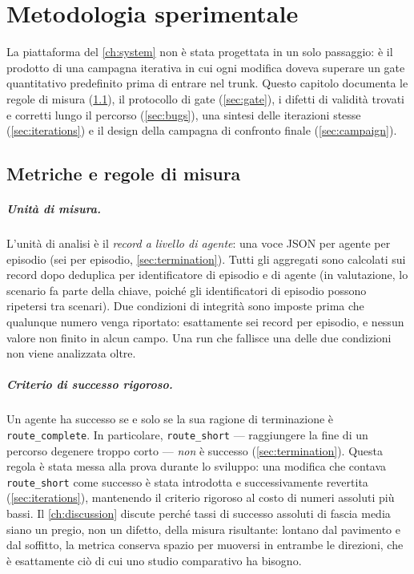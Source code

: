 \chapter{Metodologia sperimentale}
\label{ch:methodology}

La piattaforma del \cref{ch:system} non è stata progettata in un solo
passaggio: è il prodotto di una campagna iterativa in cui ogni modifica
doveva superare un gate quantitativo predefinito prima di entrare nel
trunk. Questo capitolo documenta le regole di misura
(\cref{sec:metrics}), il protocollo di gate (\cref{sec:gate}), i difetti
di validità trovati e corretti lungo il percorso (\cref{sec:bugs}), una
sintesi delle iterazioni stesse (\cref{sec:iterations}) e il design
della campagna di confronto finale (\cref{sec:campaign}).

\section{Metriche e regole di misura}
\label{sec:metrics}

\paragraph{Unità di misura.}
L'unità di analisi è il \emph{record a livello di agente}: una voce JSON
per agente per episodio (sei per episodio, \cref{sec:termination}).
Tutti gli aggregati sono calcolati sui record dopo deduplica per
identificatore di episodio e di agente (in valutazione, lo scenario fa
parte della chiave, poiché gli identificatori di episodio possono
ripetersi tra scenari). Due condizioni di integrità sono imposte prima
che qualunque numero venga riportato: esattamente sei record per
episodio, e nessun valore non finito in alcun campo. Una run che fallisce
una delle due condizioni non viene analizzata oltre.

\paragraph{Criterio di successo rigoroso.}
Un agente ha successo se e solo se la sua ragione di terminazione è
\texttt{route\_complete}. In particolare, \texttt{route\_short} ---
raggiungere la fine di un percorso degenere troppo corto --- \emph{non}
è successo (\cref{sec:termination}). Questa regola è stata messa alla
prova durante lo sviluppo: una modifica che contava \texttt{route\_short}
come successo è stata introdotta e successivamente revertita
(\cref{sec:iterations}), mantenendo il criterio rigoroso al costo di
numeri assoluti più bassi. Il \cref{ch:discussion} discute perché tassi
di successo assoluti di fascia media siano un pregio, non un difetto,
della misura risultante: lontano dal pavimento e dal soffitto, la
metrica conserva spazio per muoversi in entrambe le direzioni, che è
esattamente ciò di cui uno studio comparativo ha bisogno.


